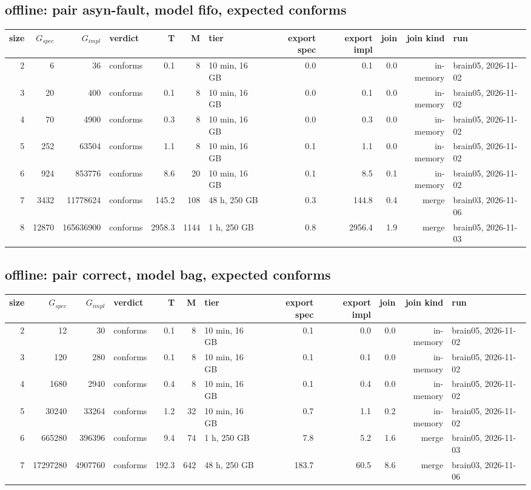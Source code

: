 \documentclass[10pt]{article}
\begin{document}
\subsection*{offline: pair \textsf{asyn-fault}, model fifo, expected conforms}
\begin{longtable}{@{}rrrlrrlrrrrl@{}}
\toprule
size & $G_{\mathit{spec}}$ & $G_{\mathit{impl}}$ & verdict & T & M & tier & export spec & export impl & join & join kind & run \\
\midrule
\endhead
\color{red} 2 & 6 & 36 & conforms & 0.1 & 8 & 10 min, 16 GB & 0.0 & 0.1 & 0.0 & in-memory & brain05, 2026-11-02 \\
\color{red} 3 & 20 & 400 & conforms & 0.1 & 8 & 10 min, 16 GB & 0.0 & 0.1 & 0.0 & in-memory & brain05, 2026-11-02 \\
\color{red} 4 & 70 & 4900 & conforms & 0.3 & 8 & 10 min, 16 GB & 0.0 & 0.3 & 0.0 & in-memory & brain05, 2026-11-02 \\
\color{red} 5 & 252 & 63504 & conforms & 1.1 & 8 & 10 min, 16 GB & 0.1 & 1.1 & 0.0 & in-memory & brain05, 2026-11-02 \\
\color{red} 6 & 924 & 853776 & conforms & 8.6 & 20 & 10 min, 16 GB & 0.1 & 8.5 & 0.1 & in-memory & brain05, 2026-11-02 \\
\color{blue} 7 & 3432 & 11778624 & conforms & 145.2 & 108 & 48 h, 250 GB & 0.3 & 144.8 & 0.4 & merge & brain03, 2026-11-06 \\
\color{blue} 8 & 12870 & 165636900 & conforms & 2958.3 & 1144 & 1 h, 250 GB & 0.8 & 2956.4 & 1.9 & merge & brain05, 2026-11-03 \\
\bottomrule
\end{longtable}
\subsection*{offline: pair \textsf{correct}, model bag, expected conforms}
\begin{longtable}{@{}rrrlrrlrrrrl@{}}
\toprule
size & $G_{\mathit{spec}}$ & $G_{\mathit{impl}}$ & verdict & T & M & tier & export spec & export impl & join & join kind & run \\
\midrule
\endhead
\color{red} 2 & 12 & 30 & conforms & 0.1 & 8 & 10 min, 16 GB & 0.1 & 0.0 & 0.0 & in-memory & brain05, 2026-11-02 \\
\color{red} 3 & 120 & 280 & conforms & 0.1 & 8 & 10 min, 16 GB & 0.1 & 0.1 & 0.0 & in-memory & brain05, 2026-11-02 \\
\color{red} 4 & 1680 & 2940 & conforms & 0.4 & 8 & 10 min, 16 GB & 0.1 & 0.4 & 0.0 & in-memory & brain05, 2026-11-02 \\
\color{red} 5 & 30240 & 33264 & conforms & 1.2 & 32 & 10 min, 16 GB & 0.7 & 1.1 & 0.2 & in-memory & brain05, 2026-11-02 \\
\color{blue} 6 & 665280 & 396396 & conforms & 9.4 & 74 & 1 h, 250 GB & 7.8 & 5.2 & 1.6 & merge & brain05, 2026-11-03 \\
\color{blue} 7 & 17297280 & 4907760 & conforms & 192.3 & 642 & 48 h, 250 GB & 183.7 & 60.5 & 8.6 & merge & brain03, 2026-11-06 \\
\bottomrule
\end{longtable}
\end{document}
